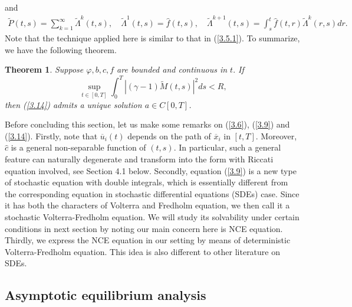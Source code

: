 \documentclass[11pt]{article}
\newtheorem{theorem}{Theorem}[section]
\begin{document}
%
and
%
\begin{eqnarray}\label{3.17}
\widetilde{P}(t,s) = \sum\limits_{k=1}^{\infty
}\widetilde{\Lambda}^{k}(t,s), \quad \widetilde{\Lambda}^{1}(t,s)
=\widehat{f}(t,s), \quad
\widetilde{\Lambda}^{k+1}(t,s)=\int_{s}^{t}\widehat{f}(t,r)\widetilde{\Lambda}^{k}(r,s)dr.
\end{eqnarray}%
%
Note that the technique applied here is similar to that in (\ref{3.5.1}). To summarize, we have the following theorem.
\begin{theorem}
Suppose $\varphi,b,c,f$ are bounded and continuous in $t.$ If
%
\[
\sup_{t\in [0,T]}\int_{0}^{T}\left\vert (\gamma-1)\widetilde{M}(t,s)\right\vert ^{2}ds<R,
\]
%
then (\ref{3.14}) admits a unique solution $a \in C[0,T]$.
\end{theorem}
Before concluding this section, let us make some remarks on
(\ref{3.6}), (\ref{3.9}) and (\ref{3.14}). Firstly, note that $\overline{u}_i(t)$ depends on the path of $\overline{x}_i$ in
$[t,T]$. Moreover, $\widehat{c}$ is a general non-separable function
of $(t,s)$. In particular, such a general feature can naturally
degenerate and transform into the form with Riccati equation
involved, see Section 4.1 below. Secondly, equation (\ref{3.9}) is a
new type of stochastic equation with double integrals, which is
essentially different from the corresponding equation in stochastic differential equations (SDEs) case.
Since it has both the characters of Volterra and Fredholm equation,
we then call it a stochastic Volterra-Fredholm equation. We will
study its solvability under certain conditions in next section by noting our main concern here is NCE equation. Thirdly, we express the NCE
equation in our setting by means of deterministic Volterra-Fredholm
equation. This idea is also different to other literature on SDEs.



\subsection{Asymptotic equilibrium analysis}
\end{document}
